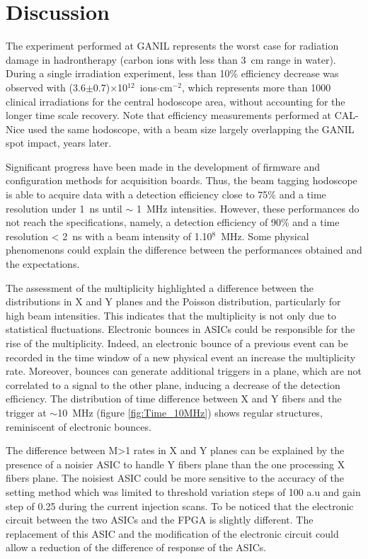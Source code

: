 \documentclass[a4paper,11pt]{article}
\begin{document}
\section{Discussion}

The experiment performed at GANIL represents the worst case for radiation damage in hadrontherapy (carbon ions with less than 3~cm range in water). During a single irradiation experiment, less than 10\% efficiency decrease was observed with (3.6$\pm$0.7)$\times$10$^{12}$~ions$\cdot$cm$^{-2}$, which represents more than 1000 clinical irradiations for the central hodoscope area, without accounting for the longer time scale recovery. Note that efficiency measurements performed at CAL-Nice used the same hodoscope, with a beam size largely overlapping the GANIL spot impact, years later.

Significant progress have been made in the development of firmware and configuration methods for acquisition boards. Thus, the beam tagging hodoscope is able to acquire data with a detection efficiency close to 75\% and a time resolution under 1~ns until $\sim$ 1~MHz intensities. However, these performances do not reach the specifications, namely, a detection efficiency of 90\% and a time resolution < 2~ns with a  beam intensity of 1.10$^{8}$~MHz. Some physical phenomenons could explain the difference between the performances obtained and the expectations.

The assessment of the multiplicity highlighted a difference between the distributions in X and Y planes and the Poisson distribution, particularly for high beam intensities. This indicates that the multiplicity is not only due to statistical fluctuations. Electronic bounces in ASICs could be responsible for the rise of the multiplicity. Indeed, an electronic bounce of a previous event can be recorded in the time window of a new physical event an increase the multiplicity rate. Moreover, bounces can generate additional triggers in a plane, which are not correlated to a signal to the other plane, inducing a decrease of the detection efficiency. The distribution of time difference between X and Y fibers and the trigger at $\sim$10~MHz (figure \ref{fig:Time_10MHz}) shows regular structures, reminiscent of electronic bounces.

The difference between M>1 rates in X and Y planes can be explained by the presence of a noisier ASIC to handle Y fibers plane than the one processing X fibers plane. The noisiest ASIC could be more sensitive to the accuracy of the setting method which was limited to threshold variation steps of 100 a.u and gain step of 0.25 during the current injection scans. To be noticed that the electronic circuit between the two ASICs and the FPGA is slightly different. The replacement of this ASIC and the modification of the electronic circuit could allow a reduction of the difference of response of the ASICs.
\end{document}
